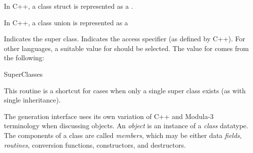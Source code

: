 \begin{functionality}
In C++, a class struct is represented as a .
\end{functionality}

\begin{functionality}
In C++, a class union is represented as a 	
\end{functionality}

\begin{functionality}
\begin{Parameters}
 Indicates the super class.
 Indicates the access specifier (as defined by C++).  For
other languages, a suitable value for  should be selected.
The value for  comes from the following:
\end{Parameters}
\end{functionality}
\begin{functionality}
\end{functionality}
	{}{SuperClasses}
\begin{functionality}
This routine is a shortcut for cases when only a single super class
exists (as with single inheritance).
\end{functionality}

\begin{functionality}
The generation interface uses its own variation of C++ and Modula-3
terminology when discussing objects.  An \emph{object} is an instance
of a \emph{class} datatype.  The components of a class are called
\emph{members}, which may be either data \emph{fields}, \emph{routines},
conversion functions, constructors, and destructors.

\end{functionality}

